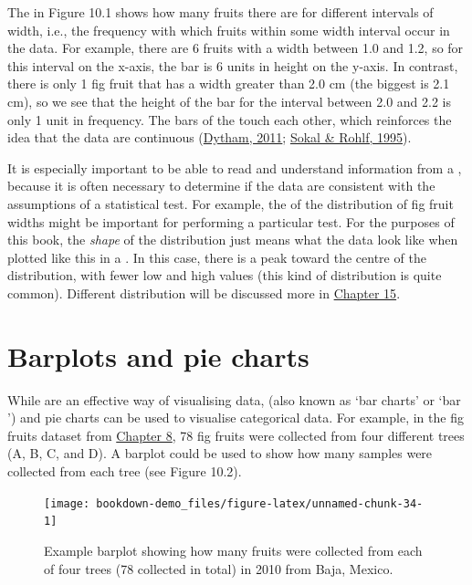 \documentclass[
  openany]{krantz}
\begin{document}
The  in Figure 10.1 shows how many fruits there are for different intervals of width, i.e., the frequency with which fruits within some width interval occur in the data.
For example, there are 6 fruits with a width between 1.0 and 1.2, so for this interval on the x-axis, the bar is 6 units in height on the y-axis.
In contrast, there is only 1 fig fruit that has a width greater than 2.0 cm (the biggest is 2.1 cm), so we see that the height of the bar for the interval between 2.0 and 2.2 is only 1 unit in frequency.
The bars of the  touch each other, which reinforces the idea that the data are continuous (\protect\hyperlink{ref-Dytham2011}{Dytham, 2011}; \protect\hyperlink{ref-Sokal1995}{Sokal \& Rohlf, 1995}).

It is especially important to be able to read and understand information from a , because it is often necessary to determine if the data are consistent with the assumptions of a statistical test.
For example, the \emph{} of the distribution of fig fruit widths might be important for performing a particular test.
For the purposes of this book, the \emph{shape} of the distribution just means what the data look like when plotted like this in a .
In this case, there is a peak toward the centre of the distribution, with fewer low and high values (this kind of distribution is quite common).
Different distribution  will be discussed more in \protect\hyperlink{Chapter_15}{Chapter 15}.

\hypertarget{barplots-and-pie-charts}{%
\section{Barplots and pie charts}\label{barplots-and-pie-charts}}

While  are an effective way of visualising  data,  (also known as `bar charts' or `bar ') and pie charts can be used to visualise categorical data.
For example, in the fig fruits dataset from \protect\hyperlink{Chapter_8}{Chapter 8}, 78 fig fruits were collected from four different trees (A, B, C, and D).
A barplot could be used to show how many samples were collected from each tree (see Figure 10.2).

\begin{figure}
\texttt{[image: bookdown-demo\_files/figure-latex/unnamed-chunk-34-1]} \caption{Example barplot showing how many fruits were collected from each of four trees (78 collected in total) in 2010 from Baja, Mexico.}\label{fig:unnamed-chunk-34}
\end{figure}
\end{document}
